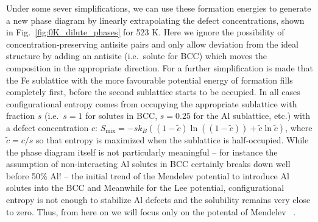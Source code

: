 Under some sever simplifications, we can use these formation energies to generate a new phase diagram by linearly extrapolating the defect concentrations, shown in Fig.~\ref{fig:0K_dilute_phases} for 523 K.
Here we ignore the possibility of concentration-preserving antisite pairs and only allow deviation from the ideal structure by adding an antisite (i.e.~solute for BCC) which moves the composition in the appropriate direction.
For \DOTHREE a further simplification is made that the Fe sublattice with the more favourable potential energy of formation fills completely first, before the second sublattice starts to be occupied.
In all cases configurational entropy comes from occupying the appropriate sublattice with fraction $s$ (i.e.~$s=1$ for solutes in BCC, $s=0.25$ for the \DOTHREE Al sublattice, etc.) with a defect concentration $c$: $S_\mathrm{mix} = -s k_B ((1 - \tilde{c}) \ln((1 - \tilde{c})) + \tilde{c}\ln\tilde{c})$, where $\tilde{c} = c/s$ so that entropy is maximized when the sublattice is half-occupied.
While the phase diagram itself is not particularly meaningful -- for instance the assumption of non-interacting Al solutes in BCC certainly breaks down well before 50\% Al! -- the initial trend of the Mendelev potential to introduce Al solutes into the BCC and
Meanwhile for the Lee potential, configurational entropy is not enough to stabilize Al defects and the solubility remains very close to zero.
Thus, from here on we will focus only on the potental of Mendelev \etal~\cite{mendelev2005effect}.
%
